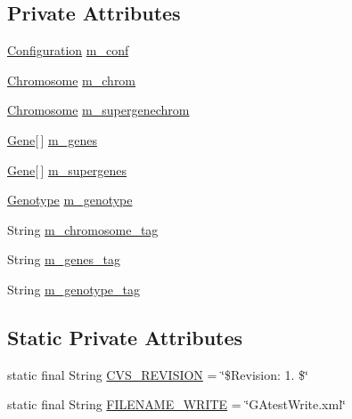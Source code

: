 \subsection*{Private Attributes}
\begin{DoxyCompactItemize}
\item 
\hyperlink{classorg_1_1jgap_1_1_configuration}{Configuration} \hyperlink{classorg_1_1jgap_1_1xml_1_1_x_m_l_manager_test_a88cbd0937879e8c66e9cc0948b40473c}{m\-\_\-conf}
\item 
\hyperlink{classorg_1_1jgap_1_1_chromosome}{Chromosome} \hyperlink{classorg_1_1jgap_1_1xml_1_1_x_m_l_manager_test_ae232c3ed4934a2bb7f113bfdc67af5bc}{m\-\_\-chrom}
\item 
\hyperlink{classorg_1_1jgap_1_1_chromosome}{Chromosome} \hyperlink{classorg_1_1jgap_1_1xml_1_1_x_m_l_manager_test_acd8fe429607d69406e1ea56ab75600da}{m\-\_\-supergenechrom}
\item 
\hyperlink{interfaceorg_1_1jgap_1_1_gene}{Gene}\mbox{[}$\,$\mbox{]} \hyperlink{classorg_1_1jgap_1_1xml_1_1_x_m_l_manager_test_af2fda23b570266a670d795ed631ecb90}{m\-\_\-genes}
\item 
\hyperlink{interfaceorg_1_1jgap_1_1_gene}{Gene}\mbox{[}$\,$\mbox{]} \hyperlink{classorg_1_1jgap_1_1xml_1_1_x_m_l_manager_test_a9f3715ab440292e64878c8f89138056a}{m\-\_\-supergenes}
\item 
\hyperlink{classorg_1_1jgap_1_1_genotype}{Genotype} \hyperlink{classorg_1_1jgap_1_1xml_1_1_x_m_l_manager_test_aa85fe08f8c8d7342b3f9bce6d85036eb}{m\-\_\-genotype}
\item 
String \hyperlink{classorg_1_1jgap_1_1xml_1_1_x_m_l_manager_test_a7d25b2f9badfb495c679528cb906f44c}{m\-\_\-chromosome\-\_\-tag}
\item 
String \hyperlink{classorg_1_1jgap_1_1xml_1_1_x_m_l_manager_test_a58f74bdf7f84d0f72451af24e717da11}{m\-\_\-genes\-\_\-tag}
\item 
String \hyperlink{classorg_1_1jgap_1_1xml_1_1_x_m_l_manager_test_a1696ad6169759c4423b1454f63d3fc0a}{m\-\_\-genotype\-\_\-tag}
\end{DoxyCompactItemize}
\subsection*{Static Private Attributes}
\begin{DoxyCompactItemize}
\item 
static final String \hyperlink{classorg_1_1jgap_1_1xml_1_1_x_m_l_manager_test_a940671372da769c848bda96e8d22e92e}{C\-V\-S\-\_\-\-R\-E\-V\-I\-S\-I\-O\-N} = \char`\"{}\$Revision\-: 1. \$\char`\"{}
\item 
static final String \hyperlink{classorg_1_1jgap_1_1xml_1_1_x_m_l_manager_test_a1a7b12fbeab2cdf56a65268c93c8998d}{F\-I\-L\-E\-N\-A\-M\-E\-\_\-\-W\-R\-I\-T\-E} = \char`\"{}G\-Atest\-Write.\-xml\char`\"{}
\end{DoxyCompactItemize}
